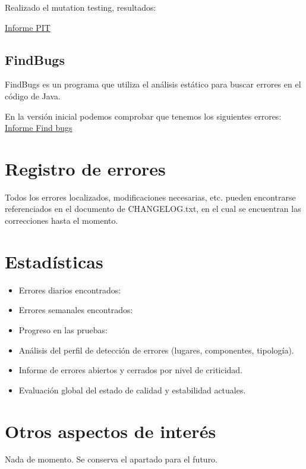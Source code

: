 \documentclass[12pt, a4paper, titlepage]{article}
\begin{document}
Realizado el mutation testing, resultados:

\href{Informes/PIT1/index.html}{Informe PIT} \\

\subsection{FindBugs}

FindBugs es un programa que utiliza el análisis estático para buscar errores en el código de Java.

En la versión inicial podemos comprobar que tenemos los siguientes errores:
\href{Informes/SiteTestInicial/findbugs.html}{Informe Find bugs} \\

\section{Registro de errores}

Todos los errores localizados, modificaciones necesarias, etc. pueden encontrarse referenciados en el documento de CHANGELOG.txt, en el cual se encuentran las correcciones hasta el momento.


\section{Estadísticas}

\begin{itemize}
	\item Errores diarios encontrados:
	\item Errores semanales encontrados:
	\item Progreso en las pruebas:
	\item Análisis del perfil de detección de errores (lugares, componentes, tipología).
	\item Informe de errores abiertos y cerrados por nivel de criticidad.
	\item Evaluación global del estado de calidad y estabilidad actuales.
\end{itemize}

\section{Otros aspectos de interés}

Nada de momento. Se conserva el apartado para el futuro.
\end{document}
